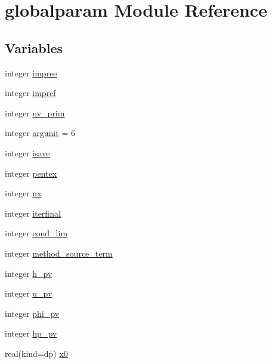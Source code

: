 \hypertarget{namespaceglobalparam}{}\section{globalparam Module Reference}
\label{namespaceglobalparam}
\subsection*{Variables}
\begin{DoxyCompactItemize}
\item 
integer \mbox{\hyperlink{namespaceglobalparam_a877f19a98e7a5d2d29ccb999f6a4b30b}{impree}}
\item 
integer \mbox{\hyperlink{namespaceglobalparam_ac4d90a4b214d99ef729a938064face25}{impref}}
\item 
integer \mbox{\hyperlink{namespaceglobalparam_a09fefe9eafe1d81a6be970794c775e36}{nv\+\_\+prim}}
\item 
integer \mbox{\hyperlink{namespaceglobalparam_a0f36e5940fffe44f73fbab54574ce74d}{argunit}} = 6
\item 
integer \mbox{\hyperlink{namespaceglobalparam_a41b8aacbc46aa9d8341860c8a0481a44}{isave}}
\item 
integer \mbox{\hyperlink{namespaceglobalparam_abf663bfec615f440c89cb9f1edf516cf}{pentex}}
\item 
integer \mbox{\hyperlink{namespaceglobalparam_a3d0778a63b55337acd79aa06b9030ad0}{nx}}
\item 
integer \mbox{\hyperlink{namespaceglobalparam_a823f2901e26e8ed4b22569b63173f812}{iterfinal}}
\item 
integer \mbox{\hyperlink{namespaceglobalparam_a0dfd817bc37d123c49006e2b980414c5}{cond\+\_\+lim}}
\item 
integer \mbox{\hyperlink{namespaceglobalparam_a6a8f3df273709fb8e343e4443306d527}{method\+\_\+source\+\_\+term}}
\item 
integer \mbox{\hyperlink{namespaceglobalparam_a46daf38606bdbc2d5b4a2864c28cae5e}{h\+\_\+pv}}
\item 
integer \mbox{\hyperlink{namespaceglobalparam_acbf50879a37a52fcc5fc5e0f06b209ba}{u\+\_\+pv}}
\item 
integer \mbox{\hyperlink{namespaceglobalparam_af964c2be0abbbecddbc35227f114fad2}{phi\+\_\+pv}}
\item 
integer \mbox{\hyperlink{namespaceglobalparam_afcc135157423c01c0db73b3f23a35616}{hp\+\_\+pv}}
\item 
real(kind=dp) \mbox{\hyperlink{namespaceglobalparam_a9e5d836cf78ed835befb0354a98e7e17}{x0}}

\end{DoxyCompactItemize}
